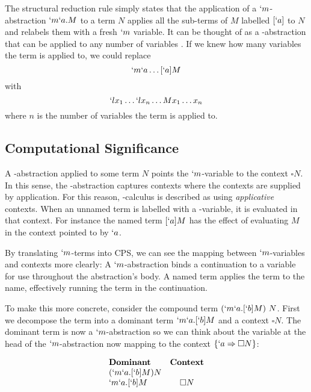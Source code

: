   The structural reduction rule simply states that the application of a $`m$-abstraction $`m`a.M$ to a term $N$ applies all the sub-terms of $M$ labelled $[`a]$ to $N$ and relabels them with a fresh $`m$ variable.
  It can be thought of as a \lam-abstraction that can be applied to any number of variables \cite{Parigot92}.
  If we knew how many variables the term is applied to, we could replace
  \[ `m`a\dots[`a]M \]
  with 
  \[ `lx_1\dots`lx_n\dots Mx_1\dots x_n \]
  where $n$ is the number of variables the term is applied to.
  
  \subsection{Computational Significance}

  A \lmu-abstraction applied to some term $N$ points the $`m$-variable to the context $\square N$.
  In this sense, the \lmu-abstraction captures contexts where the contexts are supplied by application.
  For this reason, \lmu-calculus is described as using \emph{applicative} contexts.
  When an unnamed term is labelled with a \lmu-variable, it is evaluated in that context. 
  For instance the named term $[`a]M$ has the effect of evaluating $M$ in the context pointed to by $`a$.
  
  By translating $`m$-terms into CPS, we can see the mapping between $`m$-variables and contexts more clearly:
  A $`m$-abstraction binds a continuation to a variable for use throughout the abstraction's body.
  A named term applies the term to the name, effectively running the term in the continuation.
  
  To make this more concrete, consider the compound term $(`m`a.[`b]M)\ N$. 
  First we decompose the term into a dominant term $`m`a.[`b]M$ and a context $\square N$. 
  The dominant term is now a $`m$-abstraction so we can think about the variable at the head of the $`m$-abstraction now mapping to the context $\{`a \Rightarrow \square N\}$:
  
  \begin{example}[]
  \[
  \begin{array}{lc}
    \textbf{Dominant} & \textbf{Context} \\
    (`m`a.[`b]M) N \\
    `m`a.[`b]M & \square N \\
  \end{array}
  \]
  \end{example}

